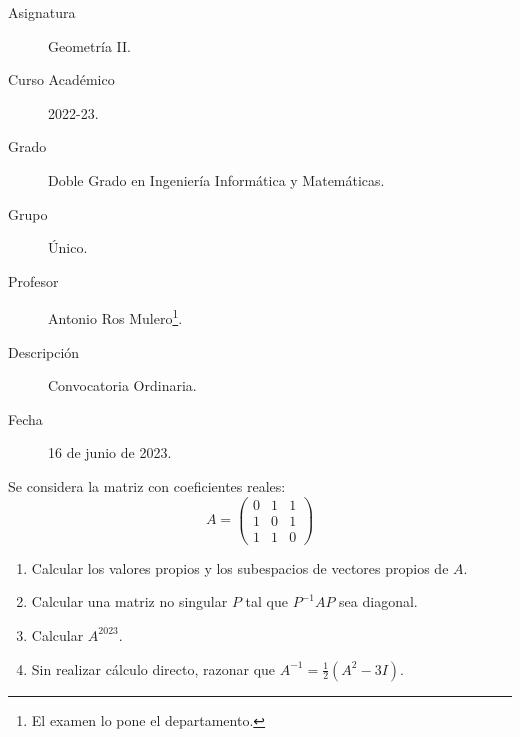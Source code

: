 \documentclass[12pt]{article}
\begin{document}

    
    

    \begin{description}
        \item[Asignatura] Geometría II.
        \item[Curso Académico] 2022-23.
        \item[Grado] Doble Grado en Ingeniería Informática y Matemáticas.
        \item[Grupo] Único.
        \item[Profesor] Antonio Ros Mulero\footnote{El examen lo pone el departamento.}.
        \item[Descripción] Convocatoria Ordinaria.
        \item[Fecha] 16 de junio de 2023.
    
    \end{description}
    \newpage
    
    \begin{ejercicio}
        Se considera la matriz con coeficientes reales:
        \begin{equation*}
            A = \left(\begin{array}{ccc}
                0 & 1 & 1 \\
                1 & 0 & 1 \\
                1 & 1 & 0
            \end{array}\right)
        \end{equation*}

        \begin{enumerate}
            \item Calcular los valores propios y los subespacios de vectores propios de $A$.

            \item Calcular una matriz no singular $P$ tal que $P^{-1}AP$ sea diagonal.

            \item Calcular $A^{2023}$.

            \item Sin realizar cálculo directo, razonar que $A^{-1}=\frac{1}{2}(A^2-3I)$.
        \end{enumerate}
    \end{ejercicio}
\end{document}
